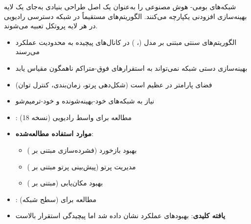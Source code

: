 

\CNchained{}

\CNchained{}

شبکه‌های بومی- هوش مصنوعی را به‌عنوان یک اصل طراحی بنیادی به‌جای یک لایه بهینه‌سازی افزودنی یکپارچه می‌کنند. الگوریتم‌های  مستقیماً در شبکه دسترسی رادیویی  در هر لایه پروتکل تعبیه می‌شوند.


\begin{itemize}
\tightlist
\item
  الگوریتم‌های سنتی مبتنی بر مدل (، ) در کانال‌های پیچیده به محدودیت عملکرد می‌رسند
\item
  بهینه‌سازی دستی شبکه نمی‌تواند به استقرارهای فوق-متراکم ناهمگون مقیاس یابد
\item
  فضای پارامتر  در  عظیم است (شکل‌دهی پرتو، زمان‌بندی، کنترل توان)
\item
  نیاز به شبکه‌های خود-بهینه‌شونده و خود-ترمیم‌شو
\end{itemize}





\begin{itemize}
\tightlist
\item
  : مطالعه  برای واسط رادیویی  (نسخه 18)
\item
  \textbf{موارد استفاده مطالعه‌شده}:

  \begin{itemize}
  \tightlist
  \item
    بهبود بازخورد  (فشرده‌سازی مبتنی بر )
  \item
    مدیریت پرتو (پیش‌بینی پرتو مبتنی بر )
  \item
    بهبود مکان‌یابی (مبتنی بر )
  \end{itemize}
\item
  : مطالعه  برای  (سطح شبکه)
\item
  \textbf{یافته کلیدی}: بهبودهای عملکرد نشان داده شد اما پیچیدگی استقرار بالاست
\end{itemize}

